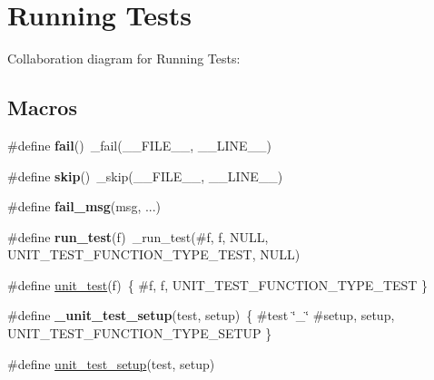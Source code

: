 \hypertarget{group__cmocka__exec}{}\section{Running Tests}
\label{group__cmocka__exec}
Collaboration diagram for Running Tests\+:
\subsection*{Macros}
\begin{DoxyCompactItemize}
\item 
\mbox{\label{group__cmocka__exec_ga73a3b169ac8c3419cbe15327e75ffcfd}} 
\#define {\bfseries fail}()~\+\_\+fail(\+\_\+\+\_\+\+F\+I\+L\+E\+\_\+\+\_\+, \+\_\+\+\_\+\+L\+I\+N\+E\+\_\+\+\_\+)
\item 
\mbox{\label{group__cmocka__exec_ga16a13f6e5592bf5bf3f678e8f950f953}} 
\#define {\bfseries skip}()~\+\_\+skip(\+\_\+\+\_\+\+F\+I\+L\+E\+\_\+\+\_\+, \+\_\+\+\_\+\+L\+I\+N\+E\+\_\+\+\_\+)
\item 
\#define {\bfseries fail\+\_\+msg}(msg, ...)
\item 
\mbox{\label{group__cmocka__exec_gaa6b02a244522b0626447a2a97c517a88}} 
\#define {\bfseries run\+\_\+test}(f)~\+\_\+run\+\_\+test(\#f, f, N\+U\+LL, U\+N\+I\+T\+\_\+\+T\+E\+S\+T\+\_\+\+F\+U\+N\+C\+T\+I\+O\+N\+\_\+\+T\+Y\+P\+E\+\_\+\+T\+E\+ST, N\+U\+LL)
\item 
\#define \hyperlink{group__cmocka__exec_gaf79fe61343efe7cdeb5bbb12a5577cb3}{unit\+\_\+test}(f)~\{ \#f, f, U\+N\+I\+T\+\_\+\+T\+E\+S\+T\+\_\+\+F\+U\+N\+C\+T\+I\+O\+N\+\_\+\+T\+Y\+P\+E\+\_\+\+T\+E\+ST \}
\item 
\mbox{\label{group__cmocka__exec_ga3679e42b787d2f1e4649b59121a6f4a1}} 
\#define {\bfseries \+\_\+unit\+\_\+test\+\_\+setup}(test,  setup)~\{ \#test \char`\"{}\+\_\+\char`\"{} \#setup, setup, U\+N\+I\+T\+\_\+\+T\+E\+S\+T\+\_\+\+F\+U\+N\+C\+T\+I\+O\+N\+\_\+\+T\+Y\+P\+E\+\_\+\+S\+E\+T\+UP \}
\item 
\#define \hyperlink{group__cmocka__exec_gaf005639a9b71cced47ce4708e53912d9}{unit\+\_\+test\+\_\+setup}(test,  setup)
\item 
\mbox{\label{group__cmocka__exec_gaa23195d0d5358670867aaa8ed9ba8e01}} 

\end{DoxyCompactItemize}

